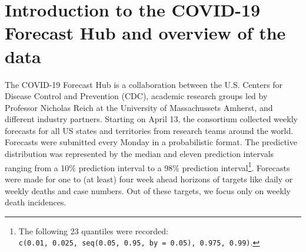 \documentclass[
]{book}
\begin{document}
\hypertarget{introduction-to-the-covid-19-forecast-hub-and-overview-of-the-data}{%
\section{Introduction to the COVID-19 Forecast Hub and overview of the data}\label{introduction-to-the-covid-19-forecast-hub-and-overview-of-the-data}}

The COVID-19 Forecast Hub \citep{umass-amherstinfluenzaforecastingcenterofexcellenceCovid19forecasthubOrg2020} is a collaboration between the U.S. Centers for Disease Control and Prevention (CDC), academic research groups led by Professor Nicholas Reich at the University of Massachussets Amherst, and different industry partners. Starting on April 13, the consortium collected weekly forecasts for all US states and territories from research teams around the world. Forecasts were submitted every Monday in a probabilistic format. The predictive distribution was represented by the median and eleven prediction intervals ranging from a 10\% prediction interval to a 98\% prediction interval\footnote{The following 23 quantiles were recorded: \texttt{c(0.01,\ 0.025,\ seq(0.05,\ 0.95,\ by\ =\ 0.05),\ 0.975,\ 0.99)}.}. Forecasts were made for one to (at least) four week ahead horizons of targets like daily or weekly deaths and case numbers. Out of these targets, we focus only on weekly death incidences.
\end{document}
